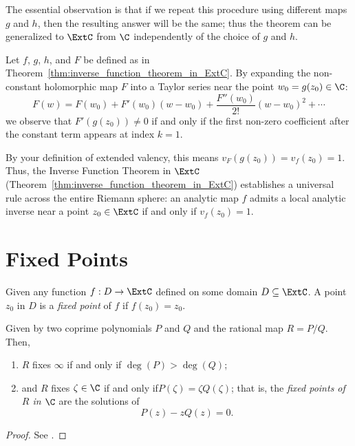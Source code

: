 The essential observation is that if we repeat this procedure using different
maps $g$ and $h$, then the resulting answer will be the same; thus the theorem
can be generalized to $\ExtC$ from $\C$ independently of the choice of $g$ and
$h$.

\begin{remark}
    Let $f$, $g$, $h$, and $F$ be defined as in
    Theorem~\ref{thm:inverse_function_theorem_in_ExtC}. By expanding the
    non-constant holomorphic map $F$ into a Taylor series near the point $w_0 =
    g(z_0) \in \C$:
    \[
        F(w) = F(w_0) + F'(w_0)(w-w_0) + \frac{F''(w_0)}{2!}(w-w_0)^2 + \cdots
    \]
    we observe that $F'(g(z_0)) \neq 0$ if and only if the first non-zero
    coefficient after the constant term appears at index $k=1$. 
    
    By your definition of extended valency, this means $v_F(g(z_0)) = v_f(z_0) =
    1$. Thus, the Inverse Function Theorem in $\ExtC$
    (Theorem~\ref{thm:inverse_function_theorem_in_ExtC}) establishes a universal
    rule across the entire Riemann sphere: an analytic map $f$ admits a local
    analytic inverse near a point $z_0 \in \ExtC$ if and only if $v_f(z_0) = 1$.
\end{remark}

\section{Fixed Points}

\begin{definition}
    Given any function $f : D \to \ExtC$ defined on some domain $D \subseteq
    \ExtC$. A point $z_0$ in $D$ is a \emph{fixed point} of $f$ if $f(z_0) =
    z_0$.
\end{definition}

\begin{proposition}
    Given by two coprime polynomials $P$ and $Q$ and the rational map $R = P/Q$.
    Then,
    \begin{enumerate}
        \item $R$ fixes $\infty$ if and only if $\deg(P) > \deg(Q)$;
        \item and $R$ fixes $\zeta \in \C$ if and only if$P(\zeta) = \zeta
        Q(\zeta)$; that is, the \emph{fixed points of $R$ in $\C$} are the
        solutions of 
        \[
            P(z) - z Q(z) = 0.
        \]
    \end{enumerate}
\end{proposition}
\begin{proof}
    See \cite[39]{Beardon1991}.
\end{proof}

